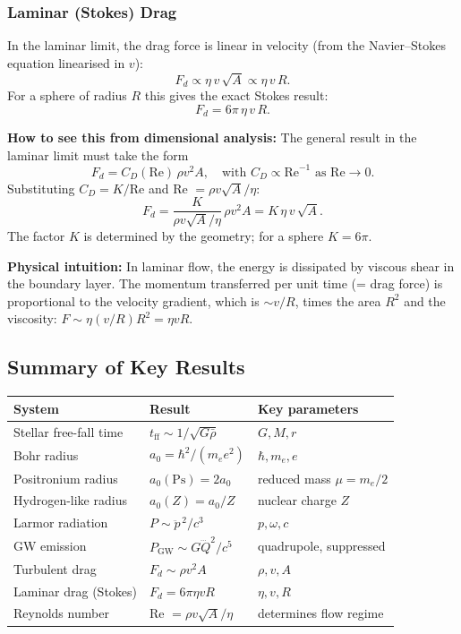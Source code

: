 \subsubsection*{Laminar (Stokes) Drag}

In the laminar limit, the drag force is linear in velocity (from the
Navier–Stokes equation linearised in $v$):
\[
    F_d \propto \eta\,v\,\sqrt{A} \propto \eta\,v\,R.
\]
For a sphere of radius $R$ this gives the exact Stokes result:
\begin{equation}
    F_d = 6\pi\,\eta\,v\,R.
    \label{eq:lec04:stokes}
\end{equation}

\textbf{How to see this from dimensional analysis:}
The general result in the laminar limit must take the form
\[
    F_d = C_D(\text{Re})\,\rho v^2 A,\quad \text{with } C_D \propto \text{Re}^{-1}
    \text{ as Re}\to 0.
\]
Substituting $C_D = K/\text{Re}$ and Re $= \rho v \sqrt{A}/\eta$:
\[
    F_d = \frac{K}{\rho v \sqrt{A}/\eta}\,\rho v^2 A = K\,\eta\,v\,\sqrt{A}.
\]
The factor $K$ is determined by the geometry; for a sphere $K = 6\pi$.

\noindent\textbf{Physical intuition:} In laminar flow, the energy is dissipated
by viscous shear in the boundary layer.  The momentum transferred per unit time
(= drag force) is proportional to the velocity gradient, which is $\sim v/R$,
times the area $R^2$ and the viscosity: $F \sim \eta (v/R) R^2 = \eta v R$.

\subsection*{Summary of Key Results}

\begin{center}
\renewcommand{\arraystretch}{1.4}
\begin{tabular}{lll}
\toprule
\textbf{System} & \textbf{Result} & \textbf{Key parameters} \\
\midrule
Stellar free-fall time & $t_\text{ff} \sim 1/\sqrt{G\bar\rho}$ & $G,M,r$ \\
Bohr radius & $a_0 = \hbar^2/(m_e e^2)$ & $\hbar, m_e, e$ \\
Positronium radius & $a_0(\text{Ps}) = 2a_0$ & reduced mass $\mu = m_e/2$ \\
Hydrogen-like radius & $a_0(Z) = a_0/Z$ & nuclear charge $Z$ \\
Larmor radiation & $P \sim \ddot{p}^{\,2}/c^3$ & $p, \omega, c$ \\
GW emission & $P_\text{GW} \sim G\dddot{Q}^2/c^5$ & quadrupole, suppressed \\
Turbulent drag & $F_d \sim \rho v^2 A$ & $\rho, v, A$ \\
Laminar drag (Stokes) & $F_d = 6\pi\eta v R$ & $\eta, v, R$ \\
Reynolds number & Re $= \rho v \sqrt{A}/\eta$ & determines flow regime \\
\bottomrule
\end{tabular}
\end{center}

